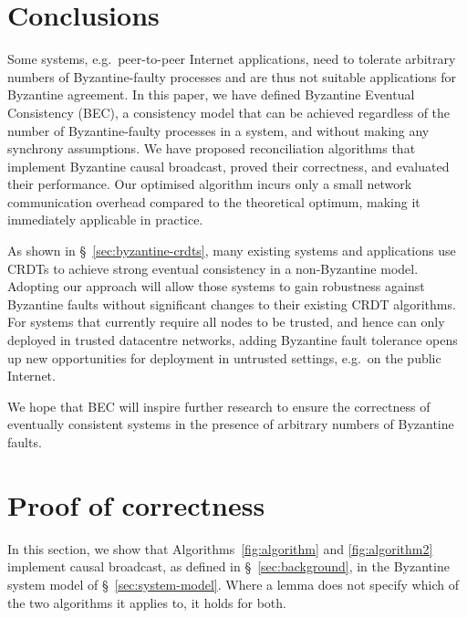 \documentclass[a4paper,anonymous,USenglish]{lipics-v2019}
\begin{document}

\section{Conclusions}

Some systems, e.g.\ peer-to-peer Internet applications, need to tolerate arbitrary numbers of Byzantine-faulty processes and are thus not suitable applications for Byzantine agreement.
In this paper, we have defined Byzantine Eventual Consistency (BEC), a consistency model that can be achieved regardless of the number of Byzantine-faulty processes in a system, and without making any synchrony assumptions.
We have proposed reconciliation algorithms that implement Byzantine causal broadcast, proved their correctness, and evaluated their performance.
Our optimised algorithm incurs only a small network communication overhead compared to the theoretical optimum, making it immediately applicable in practice.

As shown in \S~\ref{sec:byzantine-crdts}, many existing systems and applications use CRDTs to achieve strong eventual consistency in a non-Byzantine model.
Adopting our approach will allow those systems to gain robustness against Byzantine faults without significant changes to their existing CRDT algorithms.
For systems that currently require all nodes to be trusted, and hence can only deployed in trusted datacentre networks, adding Byzantine fault tolerance opens up new opportunities for deployment in untrusted settings, e.g.\ on the public Internet.

We hope that BEC will inspire further research to ensure the correctness of eventually consistent systems in the presence of arbitrary numbers of Byzantine faults.



\newpage\appendix

\section{Proof of correctness}\label{sec:proof}

In this section, we show that Algorithms~\ref{fig:algorithm} and \ref{fig:algorithm2} implement causal broadcast, as defined in \S~\ref{sec:background}, in the Byzantine system model of \S~\ref{sec:system-model}.
Where a lemma does not specify which of the two algorithms it applies to, it holds for both.
\end{document}
